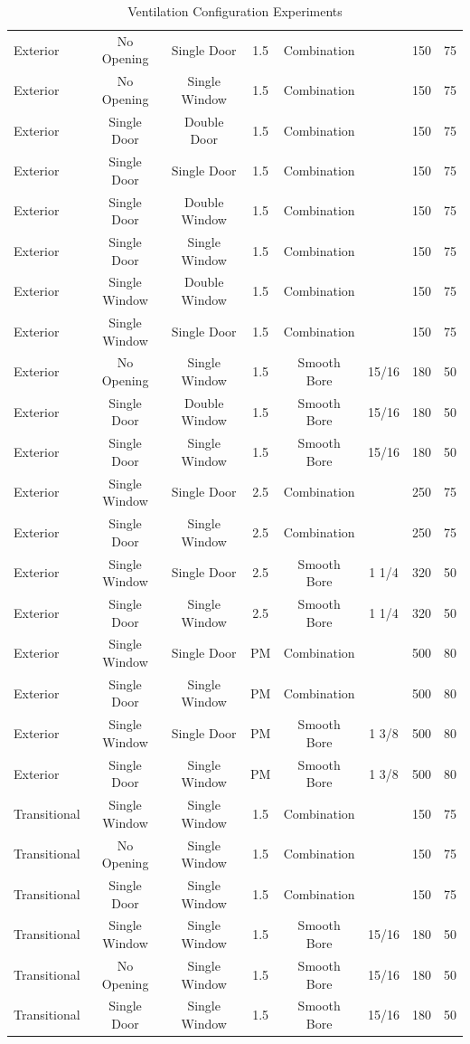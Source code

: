 \documentclass{article}
\begin{document}
\begin{table}[]
{\begin{tabular}{|lccccccc|}
Exterior & No Opening & Single Door & 1.5 & Combination &  & 150 & 75 \\
Exterior & No Opening & Single Window & 1.5 & Combination &  & 150 & 75 \\
Exterior & Single Door & Double Door & 1.5 & Combination &  & 150 & 75 \\
Exterior & Single Door & Single Door & 1.5 & Combination &  & 150 & 75 \\
Exterior & Single Door & Double Window & 1.5 & Combination &  & 150 & 75 \\
Exterior & Single Door & Single Window & 1.5 & Combination &  & 150 & 75 \\
Exterior & Single Window & Double Window & 1.5 & Combination &  & 150 & 75 \\
Exterior & Single Window & Single Door & 1.5 & Combination &  & 150 & 75 \\
Exterior & No Opening & Single Window & 1.5 & Smooth Bore & 15/16 & 180 & 50 \\
Exterior & Single Door & Double Window & 1.5 & Smooth Bore & 15/16 & 180 & 50 \\
Exterior & Single Door & Single Window & 1.5 & Smooth Bore & 15/16 & 180 & 50 \\
Exterior & Single Window & Single Door & 2.5 & Combination &  & 250 & 75 \\
Exterior & Single Door & Single Window & 2.5 & Combination &  & 250 & 75 \\
Exterior & Single Window & Single Door & 2.5 & Smooth Bore & 1 1/4 & 320 & 50 \\
Exterior & Single Door & Single Window & 2.5 & Smooth Bore & 1 1/4 & 320 & 50 \\
Exterior & Single Window & Single Door & PM & Combination &  & 500 & 80 \\
Exterior & Single Door & Single Window & PM & Combination &  & 500 & 80 \\
Exterior & Single Window & Single Door & PM & Smooth Bore & 1 3/8 & 500 & 80 \\
Exterior & Single Door & Single Window & PM & Smooth Bore & 1 3/8 & 500 & 80 \\
Transitional & Single Window & Single Window & 1.5 & Combination &  & 150 & 75 \\
Transitional & No Opening & Single Window & 1.5 & Combination &  & 150 & 75 \\
Transitional & Single Door & Single Window & 1.5 & Combination &  & 150 & 75 \\
Transitional & Single Window & Single Window & 1.5 & Smooth Bore & 15/16 & 180 & 50 \\
Transitional & No Opening & Single Window & 1.5 & Smooth Bore & 15/16 & 180 & 50 \\
Transitional & Single Door & Single Window & 1.5 & Smooth Bore & 15/16 & 180 & 50 \\ \hline
\end{tabular}}
\caption{Ventilation Configuration Experiments}
\label{Ventilation_Configuration_Experiments}
\end{table}
\end{document}
